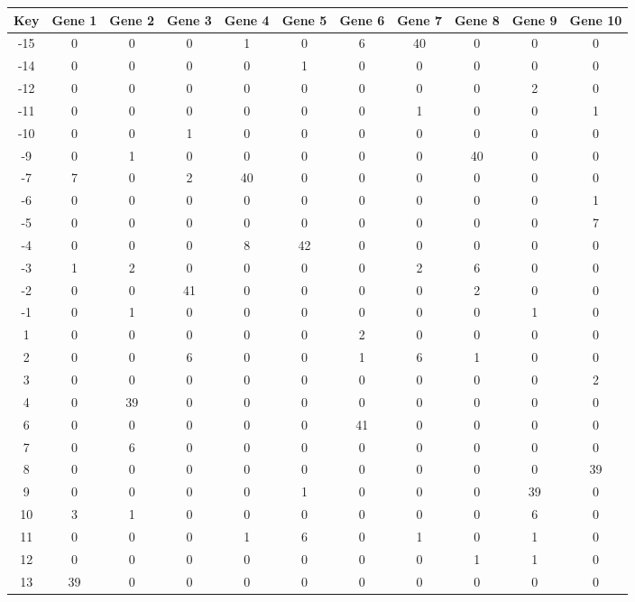 \begin{tabular}{|c|c|c|c|c|c|c|c|c|c|c|}
\hline
Key & Gene 1 & Gene 2 & Gene 3 & Gene 4 & Gene 5 & Gene 6 & Gene 7 & Gene 8 & Gene 9 & Gene 10 \\
\hline
-15 & 0 & 0 & 0 & 1 & 0 & 6 & 40 & 0 & 0 & 0 \\
-14 & 0 & 0 & 0 & 0 & 1 & 0 & 0 & 0 & 0 & 0 \\
-12 & 0 & 0 & 0 & 0 & 0 & 0 & 0 & 0 & 2 & 0 \\
-11 & 0 & 0 & 0 & 0 & 0 & 0 & 1 & 0 & 0 & 1 \\
-10 & 0 & 0 & 1 & 0 & 0 & 0 & 0 & 0 & 0 & 0 \\
-9 & 0 & 1 & 0 & 0 & 0 & 0 & 0 & 40 & 0 & 0 \\
-7 & 7 & 0 & 2 & 40 & 0 & 0 & 0 & 0 & 0 & 0 \\
-6 & 0 & 0 & 0 & 0 & 0 & 0 & 0 & 0 & 0 & 1 \\
-5 & 0 & 0 & 0 & 0 & 0 & 0 & 0 & 0 & 0 & 7 \\
-4 & 0 & 0 & 0 & 8 & 42 & 0 & 0 & 0 & 0 & 0 \\
-3 & 1 & 2 & 0 & 0 & 0 & 0 & 2 & 6 & 0 & 0 \\
-2 & 0 & 0 & 41 & 0 & 0 & 0 & 0 & 2 & 0 & 0 \\
-1 & 0 & 1 & 0 & 0 & 0 & 0 & 0 & 0 & 1 & 0 \\
1 & 0 & 0 & 0 & 0 & 0 & 2 & 0 & 0 & 0 & 0 \\
2 & 0 & 0 & 6 & 0 & 0 & 1 & 6 & 1 & 0 & 0 \\
3 & 0 & 0 & 0 & 0 & 0 & 0 & 0 & 0 & 0 & 2 \\
4 & 0 & 39 & 0 & 0 & 0 & 0 & 0 & 0 & 0 & 0 \\
6 & 0 & 0 & 0 & 0 & 0 & 41 & 0 & 0 & 0 & 0 \\
7 & 0 & 6 & 0 & 0 & 0 & 0 & 0 & 0 & 0 & 0 \\
8 & 0 & 0 & 0 & 0 & 0 & 0 & 0 & 0 & 0 & 39 \\
9 & 0 & 0 & 0 & 0 & 1 & 0 & 0 & 0 & 39 & 0 \\
10 & 3 & 1 & 0 & 0 & 0 & 0 & 0 & 0 & 6 & 0 \\
11 & 0 & 0 & 0 & 1 & 6 & 0 & 1 & 0 & 1 & 0 \\
12 & 0 & 0 & 0 & 0 & 0 & 0 & 0 & 1 & 1 & 0 \\
13 & 39 & 0 & 0 & 0 & 0 & 0 & 0 & 0 & 0 & 0 \\
\hline
\end{tabular}